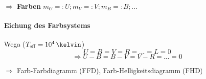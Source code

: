 $\Rightarrow$ \textbf{Farben} $m_U =: U; m_V =: V; m_B =: B; \dots$


\paragraph{Eichung des Farbsystems} Wega ($T_{\mathrm{eff}} = 10^4\,\kelvin$)
\[ U = B = V = R = \dots = L = 0 \]
\[ \Rightarrow U-B = B-V = V-R = \dots = 0 \]

$\Rightarrow$ Farb-Farbdiagramm (FFD), Farb-Helligkeitsdiagramm (FHD)

